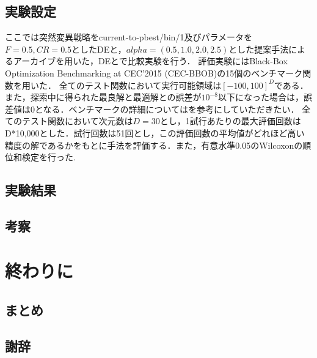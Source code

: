 \documentclass[a4paper,11pt,oneside,openany]{jsbook}
\begin{document}
\section{実験設定}
ここでは突然変異戦略をcurrent-to-pbest/bin/1及びパラメータを$F=0.5, CR=0.5$としたDEと，$alpha = (0.5, 1.0, 2.0, 2.5)$とした提案手法によるアーカイブを用いた，DEとで比較実験を行う．
評価実験にはBlack-Box Optimization Benchmarking at CEC'2015 (CEC-BBOB)の15個のベンチマーク関数を用いた．
全てのテスト関数において実行可能領域は$[-100,100]^D$である．また，探索中に得られた最良解と最適解との誤差が$10^{-8}$以下になった場合は，誤差値は0となる．ベンチマークの詳細については\cite{CEC2015}を参考にしていただきたい．
全てのテスト関数において次元数は$D=30$とし，1試行あたりの最大評価回数はD*10,000とした．試行回数は51回とし，この評価回数の平均値がどれほど高い精度の解であるかをもとに手法を評価する．また，有意水準0.05のWilcoxonの順位和検定を行った.



\section{実験結果}

\section{考察}

\chapter{終わりに}
\section{まとめ}
\section{謝辞}
\end{document}
